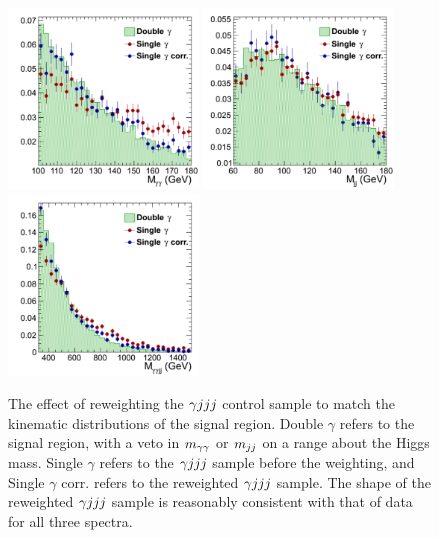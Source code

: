 \begin{figure}[ht]
 \begin{center}
   \includegraphics[width=0.45\textwidth]{figures/selection/mggSpectrum.pdf}
   \includegraphics[width=0.45\textwidth]{figures/selection/mjjSpectrum.pdf}
   \includegraphics[width=0.45\textwidth]{figures/selection/mggjjSpectrum.pdf}
 \end{center}
\caption{The effect of reweighting the $\gamma jjj$ control sample
to match the kinematic distributions of the
signal region. Double $\gamma$ refers to the signal region, with a veto in $m_{\gamma\gamma}$ or $m_{jj}$
on a range about the Higgs mass. Single $\gamma$
refers to the $\gamma jjj$ sample before the weighting, and Single $\gamma$ corr. refers to the reweighted
$\gamma jjj$ sample. The shape of the reweighted $\gamma jjj$ sample is reasonably consistent with that of data
for all three spectra.}
\label{fig:datacs}
\end{figure}

